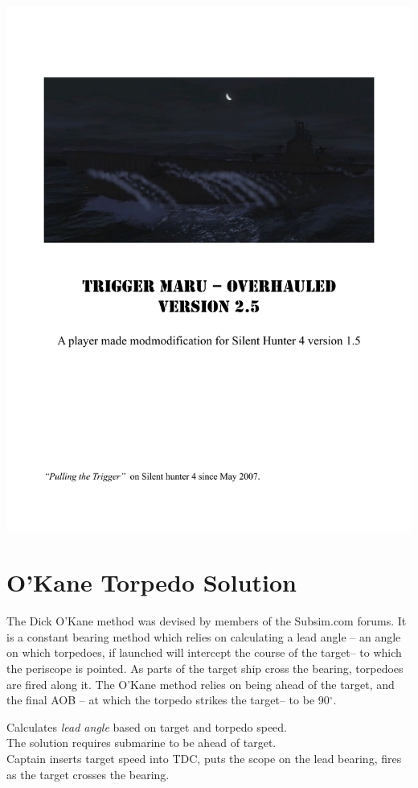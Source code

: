 \documentclass{article}
\newcommand{\degree}{$^{\circ}$}
\begin{document}
\includegraphics[page={28}, width=\textwidth, height=\textheight]{TMO_Manual}

\section{O'Kane Torpedo Solution}
The Dick O'Kane method was devised by members of the Subsim.com\cite{subsim} forums. It is a constant bearing method which relies on calculating a lead angle -- an angle on which torpedoes, if launched will intercept the course of the target-- to which the periscope is pointed. As parts of the target ship cross the bearing, torpedoes are fired along it. The O'Kane method relies on being ahead of the target, and the final AOB -- at which the torpedo strikes the target-- to be 90\degree .

Calculates \emph{lead angle} based on target and torpedo speed.\\
The solution requires submarine to be ahead of target.\\
Captain inserts target speed into TDC, puts the scope on the lead bearing, fires as the target crosses the bearing.
\end{document}
